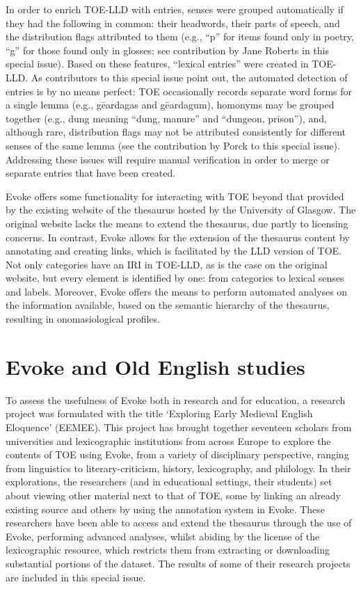 In order to enrich TOE-LLD with entries, senses were grouped automatically if they had the following in common: their headwords, their parts of speech, and the distribution flags attributed to them (e.g., “p” for items found only in poetry, “g” for those found only in glosses; see contribution by Jane Roberts in this special issue). Based on these features, “lexical entries” were created in TOE-LLD. As contributors to this special issue point out, the automated detection of entries is by no means perfect: TOE occasionally records separate word forms for a single lemma (e.g., gēardagas and gēardagum), homonyms may be grouped together (e.g., dung meaning “dung, manure” and “dungeon, prison”), and, although rare, distribution flags may not be attributed consistently for different senses of the same lemma (see the contribution by Porck to this special issue). Addressing these issues will require manual verification in order to merge or separate entries that have been created. 

Evoke offers some functionality for interacting with TOE beyond that provided by the existing website of the thesaurus hosted by the University of Glasgow. The original website lacks the means to extend the thesaurus, due partly to licensing concerns. In contrast, Evoke allows for the extension of the thesaurus content by annotating and creating links, which is facilitated by the LLD version of TOE. Not only categories have an IRI in TOE-LLD, as is the case on the original website, but every element is identified by one: from categories to lexical senses and labels. Moreover, Evoke offers the means to perform automated analyses on the information available, based on the semantic hierarchy of the thesaurus, resulting in onomasiological profiles.

\section{Evoke and Old English studies}

To assess the usefulness of Evoke both in research and for education, a research project was formulated with the title ‘Exploring Early Medieval English Eloquence’ (EEMEE). This project has brought together seventeen scholars from universities and lexicographic institutions from across Europe to explore the contents of TOE using Evoke, from a variety of disciplinary perspective, ranging from linguistics to literary-criticism, history, lexicography, and philology. In their explorations, the researchers (and in educational settings, their students) set about viewing other material next to that of TOE, some by linking an already existing source and others by using the annotation system in Evoke. These researchers have been able to access and extend the thesaurus through the use of Evoke, performing advanced analyses, whilst abiding by the license of the lexicographic resource, which restricts them from extracting or downloading substantial portions of the dataset. The results of some of their research projects are included in this special issue.

